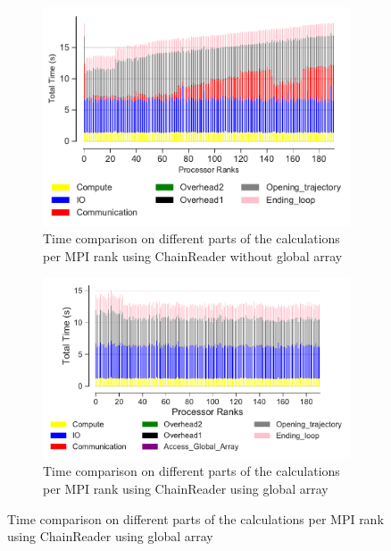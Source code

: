 \begin{figure}[ht!]
\begin{subfigure} {.45\textwidth}
  \includegraphics[width=\linewidth]{figures/chain-reader-no-ga-BarPlot-rank-comparison_192_5.pdf}
   \caption{Time comparison on different parts of the calculations per MPI rank using ChainReader without global array}
  \label{fig:MPIranks-split-chain-reader}
\end{subfigure}
\hfill
\begin{subfigure} {.45\textwidth}
  \includegraphics[width=\linewidth]{figures/chain-reader-ga-BarPlot-rank-comparison_192_3.pdf}
  \caption{Time comparison on different parts of the calculations per MPI rank using ChainReader using global array}
  \label{fig:MPIranks-split-ga-chain-reader}
\end{subfigure}


\end{figure}
